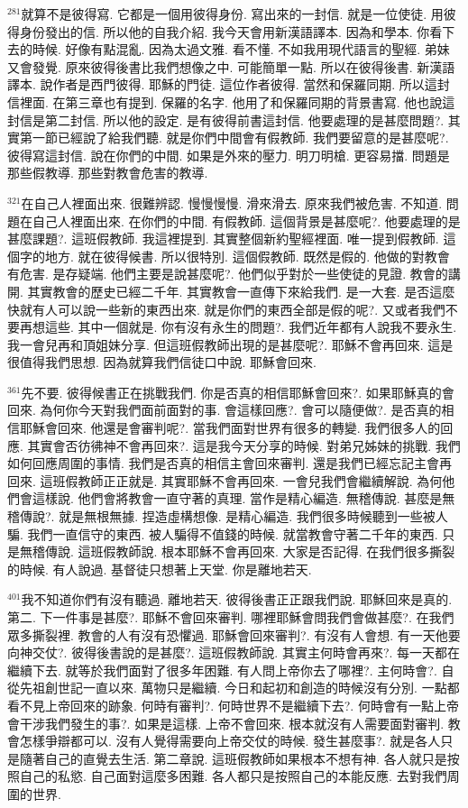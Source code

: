 \documentclass{book}
\begin{document}
$^{281}$就算不是彼得寫.
它都是一個用彼得身份.
寫出來的一封信.
就是一位使徒.
用彼得身份發出的信.
所以他的自我介紹.
我今天會用新漢語譯本.
因為和學本.
你看下去的時候.
好像有點混亂.
因為太過文雅.
看不懂.
不如我用現代語言的聖經.
弟妹又會發覺.
原來彼得後書比我們想像之中.
可能簡單一點.
所以在彼得後書.
新漢語譯本.
說作者是西門彼得.
耶穌的門徒.
這位作者彼得.
當然和保羅同期.
所以這封信裡面.
在第三章也有提到.
保羅的名字.
他用了和保羅同期的背景書寫.
他也說這封信是第二封信.
所以他的設定.
是有彼得前書這封信.
他要處理的是甚麼問題?.
其實第一節已經說了給我們聽.
就是你們中間會有假教師.
我們要留意的是甚麼呢?.
彼得寫這封信.
說在你們的中間.
如果是外來的壓力.
明刀明槍.
更容易擋.
問題是那些假教導.
那些對教會危害的教導.

$^{321}$在自己人裡面出來.
很難辨認.
慢慢慢慢.
滑來滑去.
原來我們被危害.
不知道.
問題在自己人裡面出來.
在你們的中間.
有假教師.
這個背景是甚麼呢?.
他要處理的是甚麼課題?.
這班假教師.
我這裡提到.
其實整個新約聖經裡面.
唯一提到假教師.
這個字的地方.
就在彼得候書.
所以很特別.
這個假教師.
既然是假的.
他做的對教會有危害.
是存疑端.
他們主要是說甚麼呢?.
他們似乎對於一些使徒的見證.
教會的講開.
其實教會的歷史已經二千年.
其實教會一直傳下來給我們.
是一大套.
是否這麼快就有人可以說一些新的東西出來.
就是你們的東西全部是假的呢?.
又或者我們不要再想這些.
其中一個就是.
你有沒有永生的問題?.
我們近年都有人說我不要永生.
我一會兒再和頂姐妹分享.
但這班假教師出現的是甚麼呢?.
耶穌不會再回來.
這是很值得我們思想.
因為就算我們信徒口中說.
耶穌會回來.

$^{361}$先不要.
彼得候書正在挑戰我們.
你是否真的相信耶穌會回來?.
如果耶穌真的會回來.
為何你今天對我們面前面對的事.
會這樣回應?.
會可以隨便做?.
是否真的相信耶穌會回來.
他還是會審判呢?.
當我們面對世界有很多的轉變.
我們很多人的回應.
其實會否彷彿神不會再回來?.
這是我今天分享的時候.
對弟兄姊妹的挑戰.
我們如何回應周圍的事情.
我們是否真的相信主會回來審判.
還是我們已經忘記主會再回來.
這班假教師正正就是.
其實耶穌不會再回來.
一會兒我們會繼續解說.
為何他們會這樣說.
他們會將教會一直守著的真理.
當作是精心編造.
無稽傳說.
甚麼是無稽傳說?.
就是無根無據.
捏造虛構想像.
是精心編造.
我們很多時候聽到一些被人騙.
我們一直信守的東西.
被人騙得不值錢的時候.
就當教會守著二千年的東西.
只是無稽傳說.
這班假教師說.
根本耶穌不會再回來.
大家是否記得.
在我們很多撕裂的時候.
有人說過.
基督徒只想著上天堂.
你是離地若天.

$^{401}$我不知道你們有沒有聽過.
離地若天.
彼得後書正正跟我們說.
耶穌回來是真的.
第二.
下一件事是甚麼?.
耶穌不會回來審判.
哪裡耶穌會問我們會做甚麼?.
在我們眾多撕裂裡.
教會的人有沒有恐懼過.
耶穌會回來審判?.
有沒有人會想.
有一天他要向神交仗?.
彼得後書說的是甚麼?.
這班假教師說.
其實主何時會再來?.
每一天都在繼續下去.
就等於我們面對了很多年困難.
有人問上帝你去了哪裡?.
主何時會?.
自從先祖創世記一直以來.
萬物只是繼續.
今日和起初和創造的時候沒有分別.
一點都看不見上帝回來的跡象.
何時有審判?.
何時世界不是繼續下去?.
何時會有一點上帝會干涉我們發生的事?.
如果是這樣.
上帝不會回來.
根本就沒有人需要面對審判.
教會怎樣爭辯都可以.
沒有人覺得需要向上帝交仗的時候.
發生甚麼事?.
就是各人只是隨著自己的直覺去生活.
第二章說.
這班假教師如果根本不想有神.
各人就只是按照自己的私慾.
自己面對這麼多困難.
各人都只是按照自己的本能反應.
去對我們周圍的世界.
\end{document}

